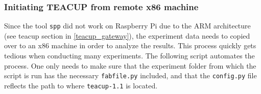 \subsubsection{Initiating TEACUP from remote x86 machine}

Since the tool \lstinline{spp} did not work on Raspberry Pi due to the ARM architecture (see \gls{teacup} section in \ref{teacup_gateway}), the experiment data needs to copied over to an x86 machine in order to analyze the results. This process quickly gets tedious when conducting many experiments. The following script automates the process. One only needs to make sure that the experiment folder from which the script is run has the necessary \lstinline{fabfile.py} included, and that the \lstinline{config.py} file reflects the path to where \lstinline{teacup-1.1} is located.

